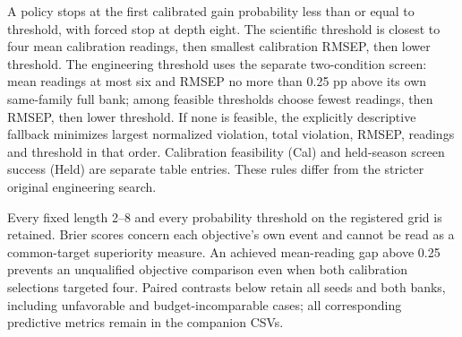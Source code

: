 \documentclass[10pt,a4paper]{article}
\begin{document}
A policy stops at the first calibrated gain probability less than or equal to threshold, with forced stop at depth eight. The scientific threshold is closest to four mean calibration readings, then smallest calibration RMSEP, then lower threshold. The engineering threshold uses the separate two-condition screen: mean readings at most six and RMSEP no more than 0.25 pp above its own same-family full bank; among feasible thresholds choose fewest readings, then RMSEP, then lower threshold. If none is feasible, the explicitly descriptive fallback minimizes largest normalized violation, total violation, RMSEP, readings and threshold in that order. Calibration feasibility (Cal) and held-season screen success (Held) are separate table entries. These rules differ from the stricter original engineering search.

Every fixed length 2--8 and every probability threshold on the registered grid is retained. Brier scores concern each objective's own event and cannot be read as a common-target superiority measure. An achieved mean-reading gap above 0.25 prevents an unqualified objective comparison even when both calibration selections targeted four. Paired contrasts below retain all seeds and both banks, including unfavorable and budget-incomparable cases; all corresponding predictive metrics remain in the companion CSVs.
\end{document}
